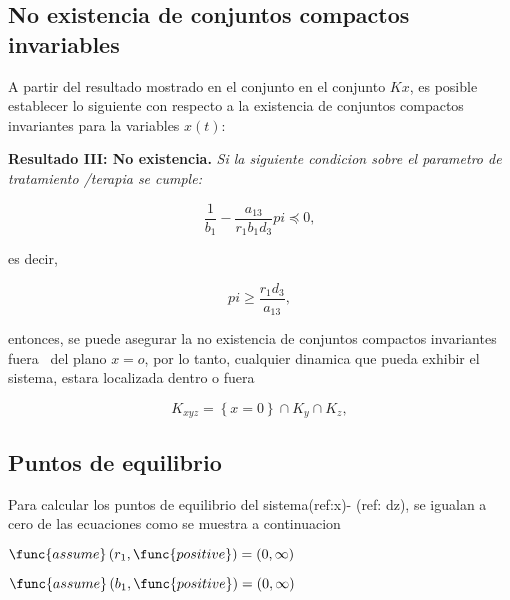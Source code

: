\documentclass[letterpaper,11pt]{article}
\begin{document}
\subsection{No existencia de conjuntos compactos invariables}

\bigskip

A partir del resultado mostrado en el conjunto en el conjunto $Kx$, es
posible establecer lo siguiente con respecto a la existencia de conjuntos
compactos invariantes para la variables $x(t):$

\bigskip

\textbf{Resultado III: No existencia. }\textit{Si la siguiente condicion
sobre el parametro de tratamiento /terapia se cumple:}

\bigskip

\begin{equation*}
\frac{1}{b_{1}}-\frac{a_{13}}{r_{1}b_{1}d_{3}}pi\preceq 0,
\end{equation*}

es decir,

\bigskip

\begin{equation*}
pi\geq \frac{r_{1}d_{3}}{a_{13}},
\end{equation*}

entonces, se puede asegurar la no existencia de conjuntos compactos
invariantes fuera \ del plano $x=o$, por lo tanto, cualquier dinamica que
pueda exhibir el sistema, estara localizada dentro o fuera

\bigskip 
\begin{equation*}
K_{xyz}=\left\{ x=0\right\} \cap K_{y}\cap K_{z},
\end{equation*}

\bigskip

\subsection{Puntos de equilibrio}

\bigskip

Para calcular los puntos de equilibrio del sistema(ref:x)- (ref: dz), se
igualan a cero de las ecuaciones como se muestra a continuacion

\bigskip

$\func{assume}\left( r_{1},\func{positive}\right) =\allowbreak \left(
0,\infty \right) $

$\func{assume}\left( b_{1},\func{positive}\right) =\allowbreak \left(
0,\infty \right) $
\end{document}
